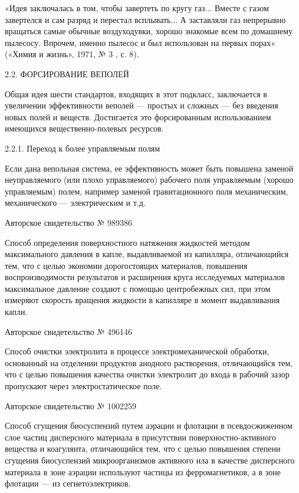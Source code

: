 «Идея  заключалась в  том, чтобы  завертеть по  кругу газ...  Вместе с
газом завертелся и сам разряд и перестал всплывать... А заставляли газ
непрерывно вращаться самые обычные  воздуходувки, хорошо знакомые всем
по домашнему  пылесосу. Впрочем, именно  пылесос и был  использован на
первых порах» («Химия и жизнь», 1971, № 3 , с. 8).

2.2. ФОРСИРОВАНИЕ ВЕПОЛЕЙ

Общая идея шести  стандартов, входящих в этот  подкласс, заключается в
увеличении эффективности  веполей — простых  и сложных —  без введения
новых полей  и веществ.  Достигается это  форсированным использованием
имеющихся вещественно-полевых ресурсов.

2.2.1. Переход к более управляемым полям

Если   дана   вепольная   система,   ее   эффективность   может   быть
повышена  заменой  неуправляемого  (или плохо  управляемого)  рабочего
поля   управляемым  (хорошо   управляемым)  полем,   например  заменой
гравитационного  поля механическим,  механического  — электрическим  и
т.д.


Авторское свидетельство № 989386

Способ   определения   поверхностного  натяжения   жидкостей   методом
максимального   давления   в   капле,  выдавливаемой   из   капилляра,
отличающийся  тем,  что  с целью  экономии  дорогостоящих  материалов,
повышения воспроизводимости результатов и расширения круга исследуемых
материалов максимальное  давление создают с помощью  центробежных сил,
при  этом измеряют  скорость вращения  жидкости в  капилляре в  момент
выдавливания капли.


Авторское свидетельство № 496146

Способ очистки  электролита в процессе  электромеханической обработки,
основанный на  отделении продуктов анодного  растворения, отличающийся
тем,  что с  целью повышения  качества очистки  электролит до  входа в
рабочий зазор пропускают через электростатическое поле.


Авторское свидетельство № 1002259

Способ   сгущения   биосуспензий   путем    аэрации   и   флотации   в
псевдосжиженном  слое  частиц   дисперсного  материала  в  присутствии
поверхностно-активного  вещества и  коагулянта, отличающийся  тем, что
с  целью  повышения   степени  сгущения  биосуспензий  микроорганизмов
активного  ила  в  качестве   дисперсного  материала  в  зоне  аэрации
используют  частицы  из  ферромагнетиков,  а  в  зоне  флотации  —  из
сегнетоэлектриков.


